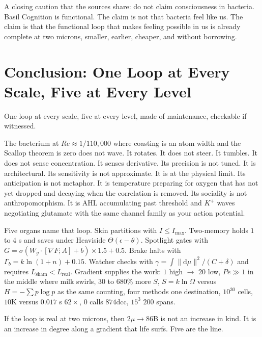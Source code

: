 \documentclass[11pt,a4paper]{article}
\begin{document}
A closing caution that the sources share: do not claim consciousness in bacteria. Basil Cognition is functional. The claim is not that bacteria feel like us. The claim is that the functional loop that makes feeling possible in us is already complete at two microns, smaller, earlier, cheaper, and without borrowing.

\section{Conclusion: One Loop at Every Scale, Five at Every Level}
\label{sec:conclusion}

One loop at every scale, five at every level, made of maintenance, checkable if witnessed.

The bacterium at $Re \approx 1/110{,}000$ where coasting is an atom width and the Scallop theorem is zero does not wave. It rotates. It does not steer. It tumbles. It does not sense concentration. It senses derivative. Its precision is not tuned. It is architectural. Its sensitivity is not approximate. It is at the physical limit. Its anticipation is not metaphor. It is temperature preparing for oxygen that has not yet dropped and decaying when the correlation is removed. Its sociality is not anthropomorphism. It is AHL accumulating past threshold and $K^+$ waves negotiating glutamate with the same channel family as your action potential.

Five organs name that loop. Skin partitions with $I \leq I_{\max}$. Two-memory holds $1$ to $4$ s and saves under Heaviside $\Theta(\epsilon-\theta)$. Spotlight gates with $G = \sigma(W_g\cdot[\nabla F;A]+b)\times1.5+0.5$. Brake halts with $\Gamma_b = k\ln(1+n)+0.15$. Watcher checks with $\gamma = \int\|\mathrm{d}\mu\|^2/(C+\delta)$ and requires $L_{\text{sham}} < L_{\text{real}}$. Gradient supplies the work: $1$ high $\to$ $20$ low, $Pe \gg 1$ in the middle where milk swirls, $30$ to $680\%$ more $S$, $S=k\ln\Omega$ versus $H=-\sum p\log p$ as the same counting, four methods one destination, $10^{30}$ cells, $10$K versus $0.017$ s $62\times$, $0$ calls $874\text{dcc}$, $15^3$ $200$ spans.

If the loop is real at two microns, then $2\mu \to 86$B is not an increase in kind. It is an increase in degree along a gradient that life surfs. Five are the line.
\end{document}
